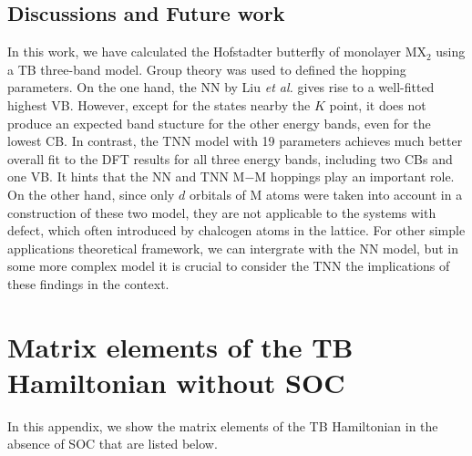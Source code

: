 \documentclass{report}
\begin{document}
\section{Discussions and Future work}
In this work, we have calculated the Hofstadter butterfly of monolayer MX$_2$ using a \ac{TB} three-band model. Group theory was used to defined the hopping parameters. On the one hand, the \ac{NN} by Liu \textit{et al.} gives rise to a well-fitted highest \ac{VB}. However, except for the states nearby the $K$ point, it does not produce an expected band stucture for the other energy bands, even for the lowest \ac{CB}. In contrast, the \ac{TNN} model with 19 parameters achieves much better overall fit to the DFT results for all three energy bands, including two CBs and one VB. It hints that the \ac{NN} and \ac{TNN} M$-$M hoppings play an important role. On the other hand, since only $d$ orbitals of M atoms were taken into account in a construction of these two model, they are not applicable to the systems with defect, which often introduced by chalcogen atoms in the lattice. For other simple applications theoretical framework, we can intergrate with the \ac{NN} model, but in some more complex model it is crucial to consider the \ac{TNN} the implications of these findings in the context.








\appendix
\renewcommand{\chaptername}{Appendix}

\chapter{Matrix elements of the TB Hamiltonian without SOC} \label{appendix A}

In this appendix, we show the matrix elements of the \ac{TB} Hamiltonian in the absence of \ac{SOC} that are listed below.
\end{document}
